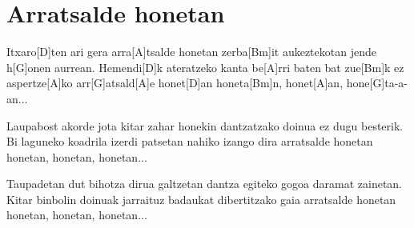 \section{Arratsalde honetan}
\begin{guitar}
Itxaro[D]ten ari gera arra[A]tsalde honetan
zerba[Bm]it aukeztekotan jende h[G]onen aurrean.
Hemendi[D]k ateratzeko kanta be[A]rri baten bat
zue[Bm]k ez aspertze[A]ko arr[G]atsald[A]e honet[D]an
honeta[Bm]n, honet[A]an, hone[G]ta-a-an...


Laupabost akorde jota kitar zahar honekin
dantzatzako doinua ez dugu besterik.
Bi laguneko koadrila izerdi patsetan
nahiko izango dira arratsalde honetan
honetan, honetan, honetan...


Taupadetan dut bihotza dirua galtzetan
dantza egiteko gogoa daramat zainetan.
Kitar binbolin doinuak jarraituz badaukat
dibertitzako gaia arratsalde honetan
honetan, honetan, honetan...
\end{guitar}
